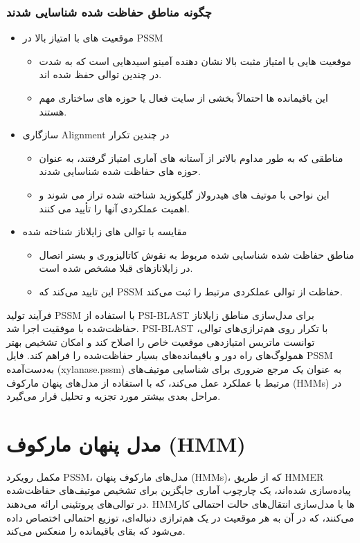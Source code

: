             \subsubsection*{چگونه مناطق حفاظت شده شناسایی شدند}
            \begin{itemize}
                \item موقعیت های با امتیاز بالا در PSSM
                \begin{itemize}
                    \item موقعیت هایی با امتیاز مثبت بالا نشان دهنده آمینو اسیدهایی است که به شدت در چندین توالی حفظ شده اند.
                    \item این باقیمانده ها احتمالاً بخشی از سایت فعال یا حوزه های ساختاری مهم هستند.
                    \end{itemize}
                \item سازگاری Alignment در چندین تکرار
                \begin{itemize}
                    \item مناطقی که به طور مداوم بالاتر از آستانه های آماری امتیاز گرفتند، به عنوان حوزه های حفاظت شده شناسایی شدند.
                    \item این نواحی با موتیف های هیدرولاز گلیکوزید شناخته شده تراز می شوند و اهمیت عملکردی آنها را تأیید می کنند.
                \end{itemize}
                \item مقایسه با توالی های زایلاناز شناخته شده
                \begin{itemize}
                    \item مناطق حفاظت شده شناسایی شده مربوط به نقوش کاتالیزوری و بستر اتصال در زایلانازهای قبلا مشخص شده است.
                    \item این تایید می‌کند که PSSM حفاظت از توالی عملکردی مرتبط را ثبت می‌کند.
                \end{itemize}
            \end{itemize}
            فرآیند تولید PSSM با استفاده از PSI-BLAST برای مدل‌سازی مناطق زایلاناز حفاظت‌شده با موفقیت اجرا شد. PSI-BLAST با تکرار روی هم‌ترازی‌های توالی، توانست ماتریس امتیازدهی موقعیت خاص را اصلاح کند و امکان تشخیص بهتر همولوگ‌های راه دور و باقیمانده‌های بسیار حفاظت‌شده را فراهم کند. فایل PSSM به‌دست‌آمده (xylanase.pssm) به عنوان یک مرجع ضروری برای شناسایی موتیف‌های مرتبط با عملکرد عمل می‌کند، که با استفاده از مدل‌های پنهان مارکوف (HMMs) در مراحل بعدی بیشتر مورد تجزیه و تحلیل قرار می‌گیرد.

        \section{مدل پنهان مارکوف (HMM)}
            مکمل رویکرد PSSM، مدل‌های مارکوف پنهان (HMMs)، که از طریق HMMER پیاده‌سازی شده‌اند، یک چارچوب آماری جایگزین برای تشخیص موتیف‌های حفاظت‌شده در توالی‌های پروتئینی ارائه می‌دهند. HMMها با مدل‌سازی انتقال‌های حالت احتمالی کار می‌کنند، که در آن به هر موقعیت در یک هم‌ترازی دنباله‌ای، توزیع احتمالی اختصاص داده می‌شود که بقای باقیمانده را منعکس می‌کند.

